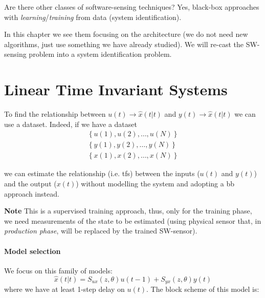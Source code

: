 Are there other classes of software-sensing techniques? Yes, black-box approaches with \emph{learning}/\emph{training} from data (system identification).
 
In this chapter we see them focusing on the architecture (we do not need new algorithms, just use something we have already studied). We will re-cast the SW-sensing problem into a system identification problem. 

\section{Linear Time Invariant Systems}\label{sec:BB-SW-LTI}

To find the relationship between $u(t) \rightarrow \hat{x}(t|t)$ and $y(t) \rightarrow \hat{x}(t|t)$ we can use a dataset.
Indeed, if we have a dataset
\begin{align*}
    \left\{ u(1), u(2), \ldots, u(N) \right\} \\
    \left\{ y(1), y(2), \ldots, y(N) \right\} \\
    \left\{ x(1), x(2), \ldots, x(N) \right\}
\end{align*}

we can estimate the relationship (i.e. \gls{tf}s) between the inputs ($u(t)$ and $y(t)$) and the output ($x(t)$) without modelling the system and adopting a \gls{bb} approach instead.

\textbf{Note} This is a supervised training approach, thus, only for the training phase, we need measurements of the state to be estimated (using physical sensor that, in \emph{production phase}, will be replaced by the trained SW-sensor).


\paragraph{Model selection} We focus on this family of models:
\[
	\hat{x}(t|t) = S_{ux}(z, \theta) u(t-1) + S_{yx}(z,\theta)y(t)
\]
where we have at least 1-step delay on $u(t)$. The block scheme of this model is: 
\begin{figure}[H]
    \centering
\end{figure}

